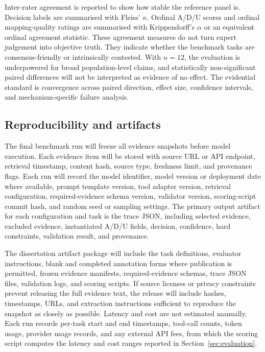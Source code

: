 Inter-rater agreement is reported to show how stable the reference panel is. Decision labels are summarised with Fleiss' $\kappa$. Ordinal A/D/U scores and ordinal mapping-quality ratings are summarised with Krippendorff's $\alpha$ or an equivalent ordinal agreement statistic. These agreement measures do not turn expert judgement into objective truth. They indicate whether the benchmark tasks are consensus-friendly or intrinsically contested. With $n=12$, the evaluation is underpowered for broad population-level claims, and statistically non-significant paired differences will not be interpreted as evidence of no effect. The evidential standard is convergence across paired direction, effect size, confidence intervals, and mechanism-specific failure analysis.

\subsection{Reproducibility and artifacts}

The final benchmark run will freeze all evidence snapshots before model execution. Each evidence item will be stored with source URL or API endpoint, retrieval timestamp, content hash, source type, freshness limit, and provenance flags. Each run will record the model identifier, model version or deployment date where available, prompt template version, tool adapter version, retrieval configuration, required-evidence schema version, validator version, scoring-script commit hash, and random seed or sampling settings. The primary output artifact for each configuration and task is the trace JSON, including selected evidence, excluded evidence, instantiated A/D/U fields, decision, confidence, hard constraints, validation result, and provenance.

The dissertation artifact package will include the task definitions, evaluator instructions, blank and completed annotation forms where publication is permitted, frozen evidence manifests, required-evidence schemas, trace JSON files, validation logs, and scoring scripts. If source licenses or privacy constraints prevent releasing the full evidence text, the release will include hashes, timestamps, URLs, and extraction instructions sufficient to reproduce the snapshot as closely as possible. Latency and cost are not estimated manually. Each run records per-task start and end timestamps, tool-call counts, token usage, provider usage records, and any external API fees, from which the scoring script computes the latency and cost ranges reported in Section~\ref{sec:evaluation}.

